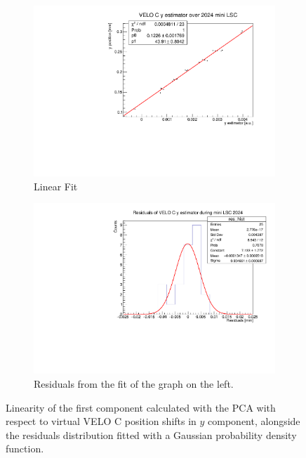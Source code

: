 \begin{figure}
    \centering
    \begin{subfigure}{0.48\textwidth}
    \includegraphics[width=\linewidth]{figures/y_fit_VELO_C_data.pdf}
    \caption{Linear Fit}\label{fig:y_veloC_fit_data}
    \end{subfigure}
    \begin{subfigure}{0.48\textwidth}
    \includegraphics[width=\linewidth]{figures/y_res_VELO_C_data.pdf}
    \caption{Residuals from the fit of the graph on the left. }\label{fig:y_veloC_res_data}
    \end{subfigure}
    \caption{Linearity of the first component calculated with the PCA with respect to  virtual VELO C position shifts in $y$ component, alongside the residuals distribution fitted with a Gaussian probability density function.}
    \label{fig:y_veloC_data}
\end{figure}

